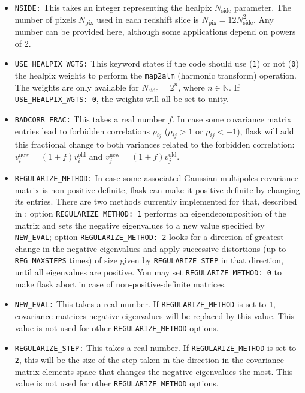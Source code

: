 \documentclass[12pt]{book} %
\newcommand{\nv}[1]{\mathrm{#1}}                 %
\begin{document}
\begin{itemize}
\item {\tt NSIDE:} This takes an integer representing the {\sc healpix} $N_{\nv{side}}$ parameter. 
  The number of pixels $N_{\nv{pix}}$ used in each redshift slice is $N_{\nv{pix}}=12N_{\nv{side}}^2$. 
  Any number can be provided here, although some applications depend on powers of 2.

\item {\tt USE\_HEALPIX\_WGTS:} This keyword states if the code should use ({\tt 1}) or not ({\tt 0}) 
  the {\sc healpix} weights to perform the {\tt map2alm} (harmonic transform) operation. The 
  weights are only available for $N_{\nv{side}}=2^n$, where $n\in \mathbb{N}$. If 
  {\tt USE\_HEALPIX\_WGTS: 0}, the weights will all be set to unity.

\item {\tt BADCORR\_FRAC:} This takes a real number $f$. In case some covariance matrix entries 
  lead to forbidden correlations $\rho_{ij}$ ($\rho_{ij}>1$ or $\rho_{ij}<-1$), {\sc flask} will 
  add this fractional change to both variances related to the forbidden correlation: 
  $v_i^{\nv{new}} = (1+f)v_i^{\nv{old}}$ and $v_j^{\nv{new}} = (1+f)v_j^{\nv{old}}$.

\item {\tt REGULARIZE\_METHOD:} In case some associated Gaussian multipoles covariance matrix 
  is non-positive-definite, {\sc flask} can make it positive-definite by changing its entries. 
  There are two methods currently implemented for that, described in \citet{Xavier16mn}: option 
  {\tt REGULARIZE\_METHOD: 1} performs an eigendecomposition of the matrix and sets the negative eigenvalues to a 
  new value specified by {\tt NEW\_EVAL}; option {\tt REGULARIZE\_METHOD: 2} looks for a direction of greatest 
  change in the negative eigenvalues and apply successive distortions (up to {\tt REG\_MAXSTEPS} 
  times) of size given by {\tt REGULARIZE\_STEP} in that direction, until all eigenvalues are positive. You may set 
  {\tt REGULARIZE\_METHOD: 0} to make {\sc flask} abort in case of non-positive-definite matrices. 

\item {\tt NEW\_EVAL:} This takes a real number. If {\tt REGULARIZE\_METHOD} is set to {\tt 1}, 
  covariance matrices negative eigenvalues will be replaced by this value. This value is not used 
  for other {\tt REGULARIZE\_METHOD} options.

\item {\tt REGULARIZE\_STEP:} This takes a real number. If {\tt REGULARIZE\_METHOD} is set to {\tt 2},
  this will be the size of the step taken in the direction in the covariance matrix elements space that 
  changes the negative eigenvalues the most.  This value is not used for other {\tt REGULARIZE\_METHOD} 
  options.
  

\end{itemize}
\end{document}
